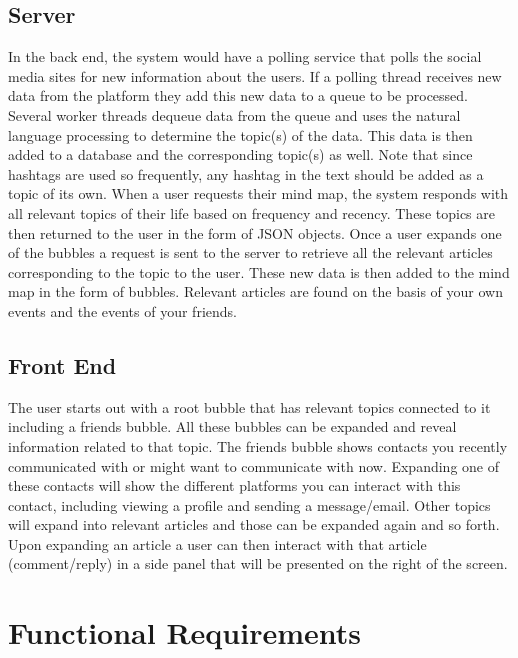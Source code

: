 \documentclass[hidelinks,english]{article}
\begin{document}
		\subsection{Server}
		In the back end, the system would have a polling service that polls the social media sites for new information about the users. If a polling thread receives new data from the platform they add this new data to a queue to be processed. Several worker threads dequeue data from the queue and uses the natural language processing to determine the topic(s) of the data. This data is then added to a database and the corresponding topic(s) as well. Note that since hashtags are used so frequently, any hashtag in the text should be added as a topic of its own. When a user requests their mind map, the system responds with all relevant topics of their life based on frequency and recency. These topics are then returned to the user in the form of JSON objects. Once a user expands one of the bubbles a request is sent to the server to retrieve all the relevant articles corresponding to the topic to the user. These new data is then added to the mind map in the form of bubbles. Relevant articles are found on the basis of your own events and the events of your friends.
		
		\subsection{Front End}
		The user starts out with a root bubble that has relevant topics connected to it including a friends bubble. All these bubbles can be expanded and reveal information related to that topic. The friends bubble shows contacts you recently communicated with or might want to communicate with now. Expanding one of these contacts will show the different platforms you can interact with this contact, including viewing a profile and sending a message/email. Other topics will expand into relevant articles and those can be expanded again and so forth. Upon expanding an article a user can then interact with that article (comment/reply) in a side panel that will be presented on the right of the screen.
	
	\section{Functional Requirements}		
\end{document}
